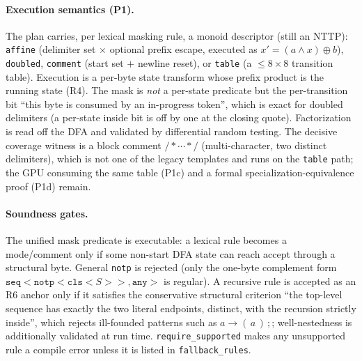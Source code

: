 \documentclass[11pt]{article}
\begin{document}
\paragraph{Execution semantics (P1).}
The plan carries, per lexical masking rule, a monoid descriptor (still an NTTP):
\texttt{affine} (delimiter set $\times$ optional prefix escape, executed as
$x'{=}(a\wedge x)\oplus b$), \texttt{doubled}, \texttt{comment}
(start set $+$ newline reset), or \texttt{table} (a $\le 8\times 8$ transition
table).  Execution is a per-byte state transform whose prefix product is the
running state (R4).  The mask is \emph{not} a per-state predicate but the
per-transition bit ``this byte is consumed by an in-progress token'', which is
exact for doubled delimiters (a per-state inside bit is off by one at the
closing quote).  Factorization is read off the DFA and validated by differential
random testing.  The decisive coverage witness is a block comment
$/*\cdots*/$ (multi-character, two distinct delimiters), which is not one of the
legacy templates and runs on the \texttt{table} path; the GPU consuming the same
table (P1c) and a formal specialization-equivalence proof (P1d) remain.

\paragraph{Soundness gates.}
The unified mask predicate is executable: a lexical rule becomes a mode/comment
only if some non-start DFA state can reach accept through a structural byte.
General \texttt{notp} is rejected (only the one-byte complement form
$\texttt{seq}{<}\texttt{notp}{<}\texttt{cls}{<}S{>}{>},\texttt{any}{>}$ is
regular).  A recursive rule is accepted as an R6 anchor only if it satisfies the
conservative structural criterion ``the top-level sequence has exactly the two
literal endpoints, distinct, with the recursion strictly inside'', which rejects
ill-founded patterns such as $a \to (\,a\,)\,;$; well-nestedness is additionally
validated at run time.  \texttt{require\_supported} makes any unsupported rule a
compile error unless it is listed in \texttt{fallback\_rules}.
\end{document}
